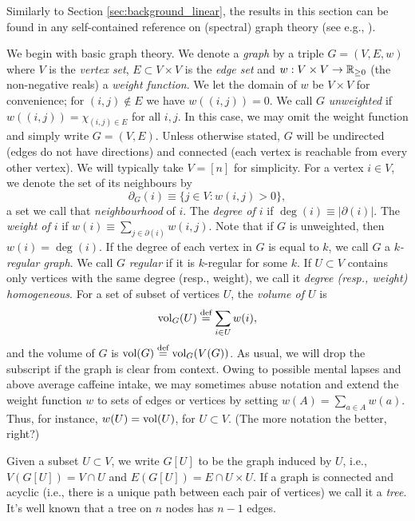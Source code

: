 Similarly to  Section \ref{sec:background_linear}, the results in this section can be found in any self-contained reference on (spectral) graph theory (see e.g., \cite{spielman2009spectral,chung1997spectral}).

We begin with basic graph theory. 
We denote a \emph{graph} by a triple $G=(V,E,w)$ where $V$ is the \emph{vertex set}, $E\subset V\times V$ is the \emph{edge set} and $w:V\times V\to\mathbb{R}_{\geq0}$ (the non-negative reals) a \emph{weight function}. We let the domain of $w$ be $V\times V$ for convenience; for $(i,j)\notin E$ we have $w((i,j))=0$. We call $G$ \emph{unweighted} if $w((i,j))=\chi_{(i,j)\in E}$ for all $i,j$. In this case, we may omit the weight function and simply write $G=(V,E)$. 
Unless otherwise stated, $G$ will be undirected (edges do not have  directions) and connected (each vertex is reachable from every other vertex). 
We will typically take $V=[n]$ for simplicity. For a  vertex $i\in V$, we denote the set of its neighbours by 
\begin{equation}
\label{eq:delta(i)}
\partial_G(i) \equiv  \{j\in V:w(i,j)>0\},
\end{equation}
a set we call that \emph{neighbourhood} of $i$. The \emph{degree of $i$} if $\deg(i)\equiv |\partial(i)|$. The \emph{weight of $i$} if $w(i)\equiv \sum_{j\in \partial(i)}w(i,j)$. Note that if $G$ is unweighted, then $w(i)=\deg(i)$. If the degree of each vertex in $G$ is equal to $k$, we call $G$ a \emph{$k$-regular graph}. We call $G$ \emph{regular} if it is $k$-regular for some $k$. If $U\subset V$ contains only vertices with the same degree (resp., weight), we call it \emph{degree (resp., weight) homogeneous}. 
For a set of subset of vertices $U$, the \emph{volume of $U$} is 
\begin{equation}
\label{eq:volU}
\textnormal{vol}_G(U) \overset{\text{def}}{=} \sum_{i\in U}w(i),
\end{equation}
and the volume of $G$ is $\textnormal{vol}(G) \overset{\text{def}}{=} \textnormal{vol}_G(V(G))$. As usual, we will drop the subscript if the graph is clear from context. 
Owing to possible mental lapses and above average caffeine intake, we may sometimes abuse notation and extend the weight function $w$ to sets of edges or vertices by setting $w(A)=\sum_{a\in A}w(a)$. Thus, for instance, $w(U) = \textnormal{vol}(U)$, for $U\subset V$. (The more notation the better, right?) 

Given a subset $U\subset  V$, we write $G[U]$ to be the graph induced by $U$, i.e., $V(G[U])  = V\cap U$ and  $E(G[U]) = E \cap U \times U$. If a graph is connected  and acyclic (i.e., there is a unique path between each pair of vertices) we call it a \emph{tree}. It's well known that a tree on $n$ nodes has $n-1$ edges.  

